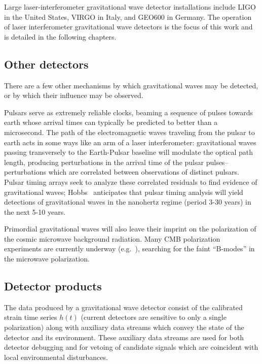 Large laser-interferometer gravitational wave detector installations
include LIGO\cite{S5InstrumentPaper} in the United States,
VIRGO\cite{Acernese2008Virgo} in Italy, and GEO600\cite{GeoStatus2008}
in Germany.
%
The operation of laser interferometer gravitational wave detectors is
the focus of this work and is detailed in the following chapters.

\subsection{Other detectors}

There are a few other mechanisms by which gravitational waves may be
detected, or by which their influence may be observed.

Pulsars serve as extremely reliable clocks, beaming a sequence of
pulses towards earth whose arrival times can typically be predicted to
better than a microsecond.  The path of the electromagnetic waves
traveling from the pulsar to earth acts in some ways like an arm of a
laser interferometer: gravitational waves passing transversely to the
Earth-Pulsar baseline will modulate the optical path length, producing
perturbations in the arrival time of the pulsar pulses--perturbations
which are correlated between observations of distinct pulsars. Pulsar
timing arrays seek to analyze these correlated residuals to find
evidence of gravitational waves;
Hobbs~\cite{Hobbs2009International} anticipates that pulsar timing
analysis will yield detections of gravitational waves in the nanohertz
regime (period 3-30 years) in the next 5-10 years.

Primordial gravitational waves will also leave their imprint on the
polarization of the cosmic microwave background radiation.  Many CMB
polarization experiments are currently underway
(e.g.~\cite{Filippini2011SPIDER}), searching for the faint ``B-modes''
in the microwave polarization.

\subsection{Detector products}

The data produced by a gravitational wave detector consist of the
calibrated strain time series $h(t)$ (current detectors are sensitive
to only a single polarization) along with auxiliary data streams which
convey the state of the detector and its environment.  These auxiliary
data streams are used for both detector debugging and for vetoing of
candidate signals which are coincident with local environmental
disturbances\cite{SlutskyThesis,Slutsky2010Methods}.

